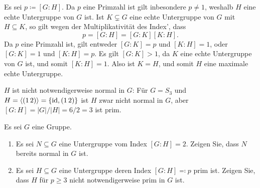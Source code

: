 \begin{solution}
  Es sei $p \coloneqq [G : H]$.
  Da $p$ eine Primzahl ist gilt inbesondere $p \neq 1$, weshalb $H$ eine echte Untergruppe von $G$ ist.
  Ist $K \subsetneq G$ eine echte Untergruppe von $G$ mit $H \subseteq K$, so gilt wegen der Multiplikativität des Index’, dass 
  \[
      p
    = [G : H]
    = [G : K] [K : H].
  \]
  Da $p$ eine Primzahl ist, gilt entweder $[G : K] = p$ und $[K : H] = 1$, oder $[G : K] = 1$ und $[K : H] = p$.
  Es gilt $[G : K] > 1$, da $K$ eine echte Untergruppe von $G$ ist, und somit $[K : H] = 1$.
  Also ist $K = H$, und somit $H$ eine maximale echte Untergruppe.
  
  $H$ ist nicht notwendigerweise normal in $G$:
  Für $G = S_3$ und $H = \langle(1\,2)\rangle = \{\operatorname{id}, (1\,2)\}$ ist $H$ zwar nicht normal in $G$, aber $[G : H] = |G|/|H| = 6/2 = 3$ ist prim.
\end{solution}


\begin{question}[subtitle = Untergruppen von Index $2$]
  Es sei $G$ eine Gruppe.
  \begin{enumerate}
    \item
      Es sei $N \subseteq G$ eine Untergruppe vom Index $[G : H] = 2$.
      Zeigen Sie, dass $N$ bereits normal in $G$ ist.
    \item
      Es sei $H \subseteq G$ eine Untergruppe deren Index $[G : H] \eqqcolon p$ prim ist.
      Zeigen Sie, dass $H$ für $p \geq 3$ nicht notwendigerweise prim in $G$ ist.
  \end{enumerate}
\end{question}


